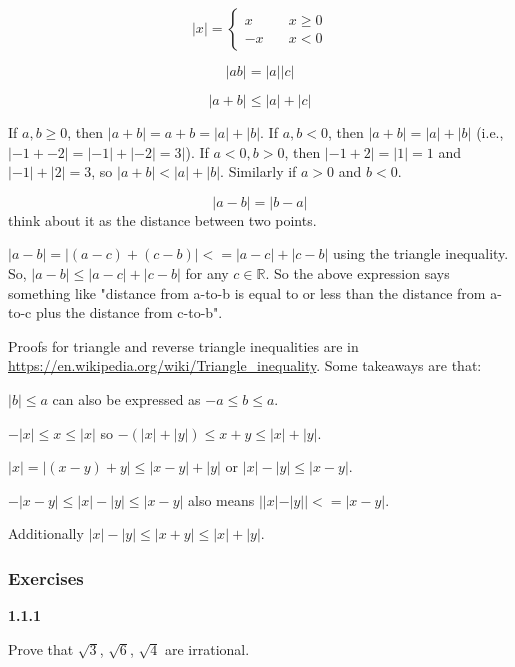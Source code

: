 \begin{equation}
|x| =
  \begin{cases}
    x   & \quad x \geq 0\\
    -x  & \quad x < 0
  \end{cases}
\end{equation}

\begin{equation}
    |ab| = |a| |c|
\end{equation}

\begin{equation}
    |a+b| \leq |a| + |c|
\end{equation}

If $a,b \geq 0$, then $|a+b| = a+b = |a| + |b|$.
If $a,b < 0$, then $|a+b| = |a| + |b|$ (i.e., $|-1 + -2| = |-1| + |-2| = 3|$).
If $a<0, b>0$, then $|-1+2| = |1|=1$ and $|-1| + |2| = 3$, so $|a+b| < |a| + |b|$. Similarly if $a>0$ and $b<0$.

\begin{equation}
    |a-b| = |b-a|
\end{equation}
think about it as the distance between two points.

$|a-b| = |(a-c) + (c-b)| <= |a-c| + |c-b|$ using the triangle inequality. 
So, $|a-b| \leq |a-c| + |c-b|$ for any $c \in \mathbb{R}$.
So the above expression says something like "distance from a-to-b is equal to or less than the distance from a-to-c
plus the distance from c-to-b".

Proofs for triangle and reverse triangle inequalities are in \url{https://en.wikipedia.org/wiki/Triangle_inequality}.
Some takeaways are that:

$|b| \leq a$ can also be expressed as $-a \leq b \leq a$.

$-|x| \leq x \leq |x|$ so $-(|x|+|y|) \leq x+y \leq |x|+|y|$.

$|x| = |(x-y) + y| \leq |x-y| + |y|$ or $|x| - |y| \leq |x-y|$.

$-|x-y| \leq |x| - |y| \leq |x-y|$ also means $||x|-|y|| <= |x-y|$.

Additionally $|x| - |y| \leq |x+y| \leq |x| + |y|$.






\subsubsection{Exercises}

\textbf{1.1.1}

Prove that $\sqrt{3}$, $\sqrt{6}$, $\sqrt{4}$ are irrational.

